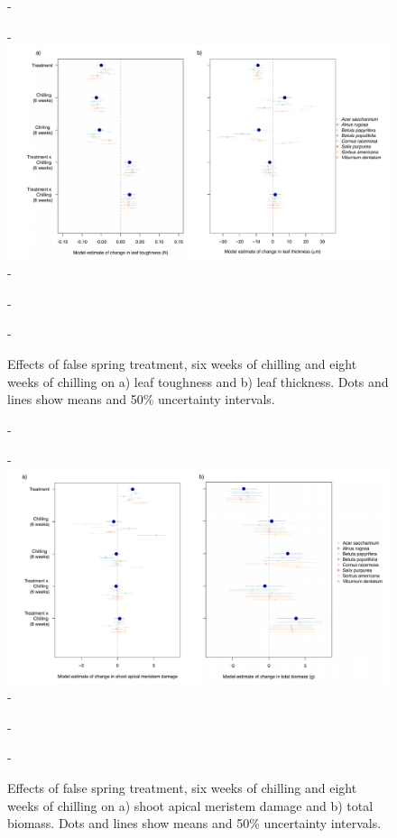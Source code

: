 \documentclass{article}\usepackage[]{graphicx}\usepackage[]{color}
\begin{document}
  {\begin{figure} [H]
  -\begin{center}
  -\includegraphics[width=18cm]{..//analyses/figures/mu_leaftraits.pdf} 
  -\caption{Effects of false spring treatment, six weeks of chilling and eight weeks of chilling on a) leaf toughness and b) leaf thickness. Dots and lines show means and 50\% uncertainty intervals. }\label{fig:muleaf}
  -\end{center}
  -\end{figure}}
  
  {\begin{figure} [H]
  -\begin{center}
  -\includegraphics[width=18cm]{..//analyses/figures/mu_growth.pdf} 
  -\caption{Effects of false spring treatment, six weeks of chilling and eight weeks of chilling on a) shoot apical meristem damage and b) total biomass. Dots and lines show means and 50\% uncertainty intervals. }\label{fig:mugrowth}
  -\end{center}
  -\end{figure}}
  
  
\end{document}
